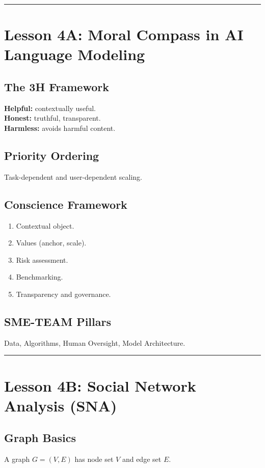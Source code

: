 \documentclass[12pt]{article}
\begin{document}
\bigskip
\hrule
\bigskip

\section*{Lesson 4A: Moral Compass in AI Language Modeling}

\subsection*{The 3H Framework}
\textbf{Helpful:} contextually useful.\\
\textbf{Honest:} truthful, transparent.\\
\textbf{Harmless:} avoids harmful content.

\subsection*{Priority Ordering}
Task-dependent and user-dependent scaling.

\subsection*{Conscience Framework}
\begin{enumerate}
    \item Contextual object.
    \item Values (anchor, scale).
    \item Risk assessment.
    \item Benchmarking.
    \item Transparency and governance.
\end{enumerate}

\subsection*{SME-TEAM Pillars}
Data, Algorithms, Human Oversight, Model Architecture.

\bigskip
\hrule
\bigskip

\section*{Lesson 4B: Social Network Analysis (SNA)}

\subsection*{Graph Basics}
A graph $G=(V,E)$ has node set $V$ and edge set $E$.
\end{document}
